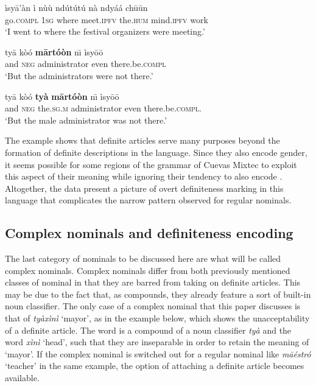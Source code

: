 \documentclass[output=paper,modfonts,nonflat]{langsci/langscibook}
\begin{document}
\ea {}\label{ex:cisneros:80}
\gll
\`isy\=a'\`an \`i n\`u\`u nd\'ut\'ut\'u {\ob}n\`a ndy\'a\'a ch\=u\=un{\cb}\\
go.\textsc{compl} 1\textsc{sg} where meet.\textsc{ipfv} {\db}the.\textsc{hum} mind.\textsc{ipfv} work\\
\glt
`I went to where the festival organizers were meeting.'

\ea
\gll
ty\=a k\`o\'o \textbf{m\=art\'o\`on} n\=\i{} \`isy\=o\=o\\
and \textsc{neg} administrator even there.be.\textsc{compl}\\
\glt
`But the administrators were not there.'

\ex
\gll
ty\=a k\`o\'o {\ob}\textbf{ty\`a} \textbf{m\=art\'o\`on}{\cb} n\=\i{} \`isy\=o\=o\\
and \textsc{neg} {\cb}the.\textsc{sg.m} administrator even there.be.\textsc{compl}.\\
\glt
`But the male administrator was not there.'
\z 
\z 

The example shows that definite articles serve many purposes beyond the formation of definite descriptions in the language.  Since they also encode gender, it seems possible for some regions of the grammar of Cuevas Mixtec to exploit this aspect of their meaning while ignoring their tendency to also encode .  Altogether, the data present a picture of overt definiteness marking in this language that complicates the narrow pattern observed for regular nominals. 

\subsection{Complex nominals and definiteness encoding} \label{sec:cisneros:5.2}

The last category of nominals to be discussed here are what will be called complex nominals.  Complex nominals differ from both previously mentioned classes of nominal in that they are barred from taking on definite articles.  This may be due to the fact that, as compounds, they already feature a sort of built-in noun classifier.  The only case of a complex nominal that this paper discusses is that of \textit{ty\`ax\`in\`i} `mayor', as in the example below, which shows the unacceptability of a definite article.  The word is a compound of a noun classifier \textit{ty\`a} and the word \textit{x\`in\`i} `head', such that they are inseparable in order to retain the meaning of `mayor'.  If the complex nominal is switched out for a regular nominal like \textit{m\=a\'estr\'o} `teacher' in the same example, the option of attaching a definite article becomes available.
\end{document}
